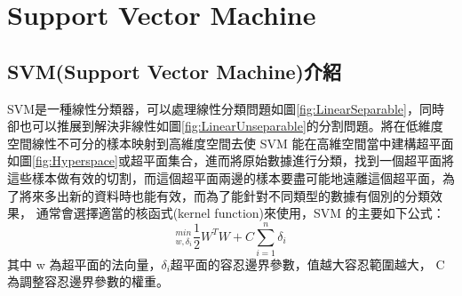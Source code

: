 \chapter{Support Vector Machine }
\label{chapter:SVM}
\section{SVM(Support Vector Machine)介紹}
SVM是一種線性分類器，可以處理線性分類問題如圖\ref{fig:LinearSeparable}，同時卻也可以推展到解決非線性如圖\ref{fig:LinearUnseparable}的分割問題。將在低維度空間線性不可分的樣本映射到高維度空間去使 SVM 能在高維空間當中建構超平面如圖\ref{fig:Hyperspace}或超平面集合，進而將原始數據進行分類，找到一個超平面將這些樣本做有效的切割，而這個超平面兩邊的樣本要盡可能地遠離這個超平面，為了將來多出新的資料時也能有效，而為了能針對不同類型的數據有個別的分類效果，
通常會選擇適當的核函式(kernel function)來使用，SVM 的主要如下公式：
\begin{equation}
	\label{eqn:SVM}
	_{w,\delta_i}^{min}\frac{1}{2}W^TW+C\sum_{i=1}^{n}\delta_i
\end{equation}
其中 w 為超平面的法向量，$\delta_i$超平面的容忍邊界參數，值越大容忍範圍越大，
C 為調整容忍邊界參數的權重。




